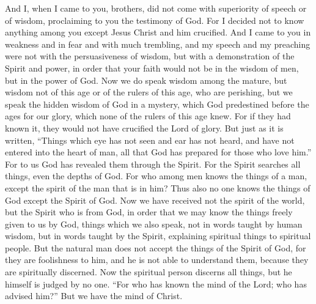 \begin{biblechapter} %
 And I, when I came to you, brothers, did not come with superiority of speech or of wisdom, proclaiming to you the testimony of God.
\verse For I decided not to know anything among you except Jesus Christ and him crucified.
\verse And I came to you in weakness and in fear and with much trembling,
\verse and my speech and my preaching were not with the persuasiveness of wisdom, but with a demonstration of the Spirit and power,
\verse in order that your faith would not be in the wisdom of men, but in the power of God.
 Now we do speak wisdom among the mature, but wisdom not of this age or of the rulers of this age, who are perishing,
\verse but we speak the hidden wisdom of God in a mystery, which God predestined before the ages for our glory,
\verse which none of the rulers of this age knew. For if they had known it, they would not have crucified the Lord of glory.
\verse But just as it is written, “Things which eye has not seen and ear has not heard, 
and have not entered into the heart of man, 
all that God has prepared for those who love him.”
\verse For to us God has revealed them through the Spirit. For the Spirit searches all things, even the depths of God.
\verse For who among men knows the things of a man, except the spirit of the man that is in him? Thus also no one knows the things of God except the Spirit of God.
\verse Now we have received not the spirit of the world, but the Spirit who is from God, in order that we may know the things freely given to us by God,
\verse things which we also speak, not in words taught by human wisdom, but in words taught by the Spirit, explaining spiritual things to spiritual people.
\verse But the natural man does not accept the things of the Spirit of God, for they are foolishness to him, and he is not able to understand them, because they are spiritually discerned.
\verse Now the spiritual person discerns all things, but he himself is judged by no one.
\verse “For who has known the mind of the Lord; who has advised him?” But we have the mind of Christ.
\end{biblechapter}

